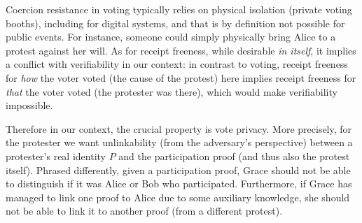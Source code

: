 Coercion resistance in voting typically relies on physical isolation
(\eg private voting booths), including for digital systems, 
and that is by definition not possible for public events.
For instance, someone could simply physically bring Alice to a protest against her will.
As for receipt freeness, while
desirable \emph{in itself}, it implies a conflict with verifiability in our context:
in contrast to voting, receipt freeness for \emph{how} the voter voted (\ie the 
cause of the protest) here implies receipt freeness for \emph{that} the voter voted 
(\ie the protester was there), which would make verifiability impossible.

Therefore in our context, the crucial property is  vote privacy.
More precisely, for the protester we want unlinkability (from the adversary's 
perspective) between a protester's real identity \(P\) and the participation 
proof (and thus also the protest itself).
Phrased differently, given a participation proof, Grace should not be able to 
distinguish if it was Alice or Bob who participated.
Furthermore, if Grace has managed to link one proof to Alice due to some 
auxiliary knowledge, she should not be able to link it to another proof (from a different protest).



